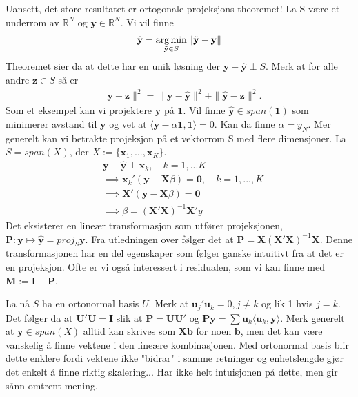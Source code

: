 Uansett, det store resultatet er ortogonale projeksjons theoremet! La S være et underrom av $\mathbb{R}^N$ og $\mathbf{y} \in \mathbb{R}^N$. Vi vil finne
\begin{align}
\hat{\mathbf{y}} = \operatorname*{arg\,min}_{\tilde{\mathbf{y}} \in S} \| \tilde{\mathbf{y}}-\mathbf{y} \|
\end{align}
Theoremet sier da at dette har en unik løsning der $\mathbf{y}-\hat{\mathbf{y}} \perp S$. Merk at for alle andre $\mathbf{z} \in S$ så er 
\begin{align}
\|\mathbf{y}-\mathbf{z}\|^2 = \|\mathbf{y}-\hat{\mathbf{y}}\|^2 + \|\hat{\mathbf{y}}-\mathbf{z}\|^2.
\end{align}
Som et eksempel kan vi projektere $\mathbf{y}$ på $\mathbf{1}$. Vil finne $\hat{\mathbf{y}} \in span(\mathbf{1})$ som minimerer avstand til $\mathbf{y}$ og vet at $\langle\mathbf{y}-\alpha\mathbf{1},\mathbf{1}\rangle = 0$. Kan da finne $\alpha = \bar{y}_N$. Mer generelt kan vi betrakte projeksjon på et vektorrom S med flere dimensjoner. La $S=span(X)$, der $X:=\{\mathbf{x}_1,...,\mathbf{x}_K\}$.
\begin{align}
&\mathbf{y}-\hat{\mathbf{y}} \perp \mathbf{x}_k, \quad k=1,...K \\
& \implies \mathbf{x}_k'(\mathbf{y}-\mathbf{X}\beta)= \mathbf{0},  \quad k=1,...,K\\
& \implies \mathbf{X}'(\mathbf{y}-\mathbf{X}\beta) = \mathbf{0} \\
& \implies \beta = \left(\mathbf{X}'\mathbf{X}\right)^{-1}\mathbf{X}'y
\end{align}
Det eksisterer en lineær transformasjon som utfører projeksjonen, $\mathbf{P}:\mathbf{y} \mapsto \hat{\mathbf{y}} = proj_S \mathbf{y}$. Fra utledningen over følger det at $\mathbf{P} = \mathbf{X}\left(\mathbf{X}'\mathbf{X}\right)^{-1}\mathbf{X}$. Denne transformasjonen har en del egenskaper som følger ganske intuitivt fra at det er en projeksjon. Ofte er vi også interessert i residualen, som vi kan finne med $\mathbf{M}:= \mathbf{I}-\mathbf{P}$.

La nå $S$ ha en ortonormal basis $U$. Merk at $\mathbf{u}_j'\mathbf{u}_k = 0, j \neq k$ og lik 1 hvis $j = k$.  Det følger da at $\mathbf{U}'\mathbf{U} = \mathbf{I}$ slik at $\mathbf{P}=\mathbf{U}\mathbf{U}'$ og $\mathbf{P}\mathbf{y} = \sum \mathbf{u}_k \langle\mathbf{u}_k,\mathbf{y}\rangle$. Merk generelt at $\mathbf{y} \in span(X)$ alltid kan skrives som $\mathbf{X}\mathbf{b}$ for noen $\mathbf{b}$, men det kan være vanskelig å finne vektene i den lineære kombinasjonen. Med ortonormal basis blir dette enklere fordi vektene ikke "bidrar" i samme retninger og enhetslengde gjør det enkelt å finne riktig skalering... Har ikke helt intuisjonen på dette, men gir sånn omtrent mening.
